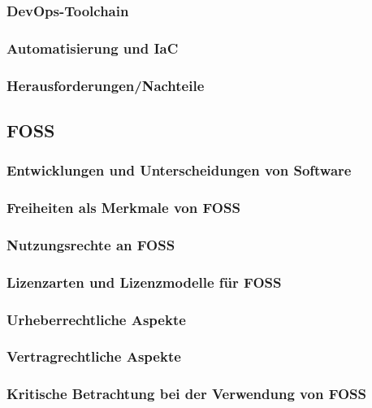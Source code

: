 \documentclass[12pt,titlepage]{article}
\begin{document}


\subsubsection{DevOps-Toolchain}



\subsubsection{Automatisierung und IaC}



\subsubsection{Herausforderungen/Nachteile}



\subsection{FOSS}



\subsubsection{Entwicklungen und Unterscheidungen von Software}
\subsubsection{Freiheiten als Merkmale von FOSS}
\subsubsection{Nutzungsrechte an FOSS}
\subsubsection{Lizenzarten und Lizenzmodelle für FOSS}
\subsubsection{Urheberrechtliche Aspekte}
\subsubsection{Vertragrechtliche Aspekte}
\subsubsection{Kritische Betrachtung bei der Verwendung von FOSS}
\end{document}
